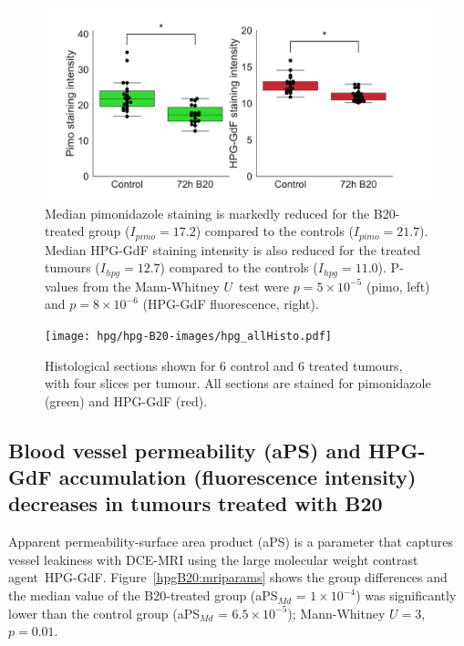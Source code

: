 \begin{figure}[htbp] %
  \centering
  \includegraphics[width=\textwidth]{hpg/hpg-B20-images/hpg_pimoHPG-GdF.pdf}
  \caption{Median pimonidazole staining is markedly reduced for the B20-treated group ($I_{pimo} = 17.2$) compared to the controls ($I_{pimo} = 21.7$).
  Median \acs{HPG-GdF} staining intensity is also reduced for the treated tumours ($I_{hpg} = 12.7$) compared to the controls ($I_{hpg} =11.0$).
  P-values from the Mann-Whitney $U$~test were $p = 5\times10^{-5}$ (pimo, left) and $p = 8\times10^{-6}$ (\acs{HPG-GdF} fluorescence, right).}
  \label{hpgB20:accumulation}
\end{figure}

\begin{figure}[htbp] %
  \centering
  \texttt{[image: hpg/hpg-B20-images/hpg\_allHisto.pdf]} 
  \captionsetup{width=\linewidth}
  \caption{Histological sections shown for 6 control and 6 treated tumours, with four slices per tumour. All sections are stained for pimonidazole (green) and \acs{HPG-GdF} (red).}
  \label{hpg:allHisto}
\end{figure}

\subsection{Blood vessel permeability (\acs{aPS}) and HPG-GdF accumulation (fluorescence intensity) decreases in tumours treated with B20}

Apparent permeability-surface area product (\acs{aPS}) is a parameter that captures vessel leakiness with \acs{DCE-MRI} using the large molecular weight contrast agent~\acs{HPG-GdF}.
Figure~\ref{hpgB20:mriparams} shows the group differences and the median value of the B20-treated group (aPS$_{Md}$ = $1\times10^{-4}$) was significantly lower than the control group (aPS$_{Md}$ = $6.5\times10^{-5}$); Mann-Whitney $U = 3$, $p = 0.01$.

